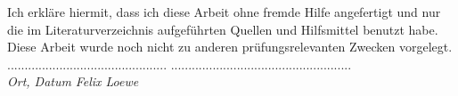\documentclass[a4paper,ngerman,oneside,titlepage,bibliography=totoc,11pt]{scrreprt}
\begin{document}
Ich erkläre hiermit, dass ich diese Arbeit ohne fremde Hilfe angefertigt und nur die im Literaturverzeichnis aufgeführten Quellen und Hilfsmittel benutzt habe. Diese Arbeit wurde noch nicht zu anderen prüfungsrelevanten Zwecken vorgelegt.\\[1.5cm]

\noindent ..............................................
\qquad\qquad\qquad\qquad\qquad
....................................................\\[0.5mm]
\textit{Ort, Datum}
\qquad\qquad\qquad\qquad\qquad\qquad\qquad\qquad\qquad
\textit{Felix Loewe}
\end{document}
